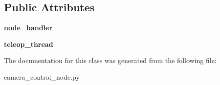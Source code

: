 \subsection*{Public Attributes}
\begin{DoxyCompactItemize}
\item 
\hypertarget{classcamera__control__node_1_1camera__qt__gui_1_1thread__clutchNGo_a88f44efe5e4ba7838aa9fee2942f815a}{{\bfseries node\-\_\-handler}}\label{classcamera__control__node_1_1camera__qt__gui_1_1thread__clutchNGo_a88f44efe5e4ba7838aa9fee2942f815a}

\item 
\hypertarget{classcamera__control__node_1_1camera__qt__gui_1_1thread__clutchNGo_a349fe7d8347d58f790291e344556f5ed}{{\bfseries teleop\-\_\-thread}}\label{classcamera__control__node_1_1camera__qt__gui_1_1thread__clutchNGo_a349fe7d8347d58f790291e344556f5ed}

\end{DoxyCompactItemize}


The documentation for this class was generated from the following file\-:\begin{DoxyCompactItemize}
\item 
camera\-\_\-control\-\_\-node.\-py\end{DoxyCompactItemize}
